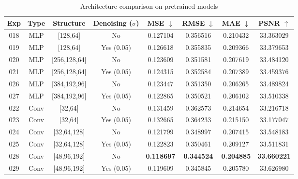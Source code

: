 \documentclass[10pt,letterpaper]{article}
\begin{document}
\begin{table}[t]
\centering
\caption{Architecture comparison on pretrained models}
\label{tab:arch_comp_pretrain}
\scriptsize
\setlength{\tabcolsep}{4pt}
\begin{tabular}{c c c c c c c c}
\toprule
Exp & Type & Structure & Denoising ($\sigma$) & MSE $\downarrow$ & RMSE $\downarrow$ & MAE $\downarrow$ & PSNR $\uparrow$ \\
\midrule
018 & MLP  & [128,64]       & No         & 0.127104 & 0.356516 & 0.210432 & 33.363029 \\
019 & MLP  & [128,64]       & Yes (0.05) & 0.126618 & 0.355835 & 0.209366 & 33.379653 \\
020 & MLP  & [256,128,64]   & No         & 0.123609 & 0.351581 & 0.207619 & 33.484120 \\
021 & MLP  & [256,128,64]   & Yes (0.05) & 0.124315 & 0.352584 & 0.207389 & 33.459376 \\
026 & MLP  & [384,192,96]   & No         & 0.123447 & 0.351350 & 0.206265 & 33.489824 \\
027 & MLP  & [384,192,96]   & Yes (0.05) & 0.122865 & 0.350521 & 0.206102 & 33.510338 \\
\midrule
022 & Conv & [32,64]        & No         & 0.131459 & 0.362573 & 0.214654 & 33.216718 \\
023 & Conv & [32,64]        & Yes (0.05) & 0.132665 & 0.364233 & 0.215150 & 33.177047 \\
024 & Conv & [32,64,128]    & No         & 0.121799 & 0.348997 & 0.207415 & 33.548183 \\
025 & Conv & [32,64,128]    & Yes (0.05) & 0.122823 & 0.350461 & 0.209127 & 33.511831 \\
028 & Conv & [48,96,192]    & No         & \textbf{0.118697} & \textbf{0.344524} & \textbf{0.204885} & \textbf{33.660221} \\
029 & Conv & [48,96,192]    & Yes (0.05) & 0.119609 & 0.345845 & 0.205780 & 33.626980 \\
\bottomrule
\end{tabular}
\end{table}
\end{document}
